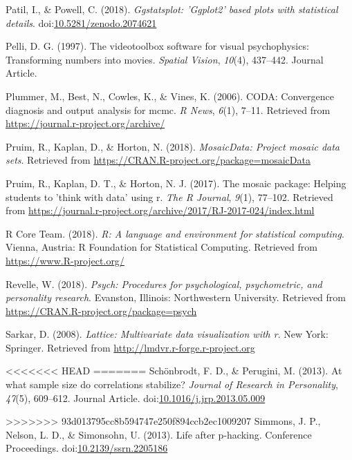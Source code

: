 \documentclass[
  man]{apa6}
\begin{document}
\leavevmode\hypertarget{ref-R-ggstatsplot}{}%
Patil, I., \& Powell, C. (2018). \emph{Ggstatsplot: 'Ggplot2' based plots with statistical details}. doi:\href{https://doi.org/10.5281/zenodo.2074621}{10.5281/zenodo.2074621}

\leavevmode\hypertarget{ref-Pelli_1997}{}%
Pelli, D. G. (1997). The videotoolbox software for visual psychophysics: Transforming numbers into movies. \emph{Spatial Vision}, \emph{10}(4), 437--442. Journal Article.

\leavevmode\hypertarget{ref-R-coda}{}%
Plummer, M., Best, N., Cowles, K., \& Vines, K. (2006). CODA: Convergence diagnosis and output analysis for mcmc. \emph{R News}, \emph{6}(1), 7--11. Retrieved from \url{https://journal.r-project.org/archive/}

\leavevmode\hypertarget{ref-R-mosaicData}{}%
Pruim, R., Kaplan, D., \& Horton, N. (2018). \emph{MosaicData: Project mosaic data sets}. Retrieved from \url{https://CRAN.R-project.org/package=mosaicData}

\leavevmode\hypertarget{ref-R-mosaic}{}%
Pruim, R., Kaplan, D. T., \& Horton, N. J. (2017). The mosaic package: Helping students to 'think with data' using r. \emph{The R Journal}, \emph{9}(1), 77--102. Retrieved from \url{https://journal.r-project.org/archive/2017/RJ-2017-024/index.html}

\leavevmode\hypertarget{ref-R-base}{}%
R Core Team. (2018). \emph{R: A language and environment for statistical computing}. Vienna, Austria: R Foundation for Statistical Computing. Retrieved from \url{https://www.R-project.org/}

\leavevmode\hypertarget{ref-R-psych}{}%
Revelle, W. (2018). \emph{Psych: Procedures for psychological, psychometric, and personality research}. Evanston, Illinois: Northwestern University. Retrieved from \url{https://CRAN.R-project.org/package=psych}

\leavevmode\hypertarget{ref-R-lattice}{}%
Sarkar, D. (2008). \emph{Lattice: Multivariate data visualization with r}. New York: Springer. Retrieved from \url{http://lmdvr.r-forge.r-project.org}

<<<<<<< HEAD
=======
\leavevmode\hypertarget{ref-Schuxf6nbrodt_Perugini_2013}{}%
Schönbrodt, F. D., \& Perugini, M. (2013). At what sample size do correlations stabilize? \emph{Journal of Research in Personality}, \emph{47}(5), 609--612. Journal Article. doi:\href{https://doi.org/10.1016/j.jrp.2013.05.009}{10.1016/j.jrp.2013.05.009}

>>>>>>> 93d013795cc8b594747e250f894ccb2ec1009207
\leavevmode\hypertarget{ref-Simmons_2013_life}{}%
Simmons, J. P., Nelson, L. D., \& Simonsohn, U. (2013). Life after p-hacking. Conference Proceedings. doi:\href{https://doi.org/10.2139/ssrn.2205186}{10.2139/ssrn.2205186}
\end{document}
